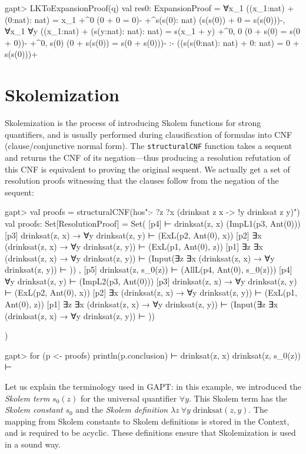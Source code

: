\documentclass[a4paper,11pt]{book}
\begin{document}
\begin{clilisting}
gapt> LKToExpansionProof(q)
val res0: ExpansionProof = ∀x_1 ((x_1:nat) + (0:nat): nat) = x_1
  +^{0} (0 + 0 = 0)-
  +^{s(s(0): nat)} (s(s(0)) + 0 = s(s(0)))-,
∀x_1 ∀y ((x_1:nat) + (s(y:nat): nat): nat) = s(x_1 + y)
  +^{0, 0} (0 + s(0) = s(0 + 0))-
  +^{0, s(0)} (0 + s(s(0)) = s(0 + s(0)))-
:-
((s(s(0:nat): nat) + 0: nat) = 0 + s(s(0)))+

\end{clilisting}

\section{Skolemization}\label{secskolem}

Skolemization is the process of introducing Skolem functions for strong
quantifiers, and is usually performed during clausification of formulas into
CNF (clause/conjunctive normal form).  The \texttt{structuralCNF} function
takes a sequent and returns the CNF of its negation---thus producing a
resolution refutation of this CNF is equivalent to proving the original
sequent.  We actually get a set of resolution proofs witnessing that the
clauses follow from the negation of the sequent:
\begin{clilisting}
gapt> val proofs = structuralCNF(hos":- ?z ?x (drinksat z x -> !y drinksat z y)")
val proofs: Set[ResolutionProof] = Set(
  [p4]  ⊢ drinksat(z, x)   (ImpL1(p3, Ant(0)))
[p3] drinksat(z, x) → ∀y drinksat(z, y) ⊢    (ExL(p2, Ant(0), x))
[p2] ∃x (drinksat(z, x) → ∀y drinksat(z, y)) ⊢    (ExL(p1, Ant(0), z))
[p1] ∃z ∃x (drinksat(z, x) → ∀y drinksat(z, y)) ⊢    (Input(∃z ∃x (drinksat(z, x) → ∀y drinksat(z, y)) ⊢ ))
,
  [p5] drinksat(z, s_0(z)) ⊢    (AllL(p4, Ant(0), s_0(z)))
[p4] ∀y drinksat(z, y) ⊢    (ImpL2(p3, Ant(0)))
[p3] drinksat(z, x) → ∀y drinksat(z, y) ⊢    (ExL(p2, Ant(0), x))
[p2] ∃x (drinksat(z, x) → ∀y drinksat(z, y)) ⊢    (ExL(p1, Ant(0), z))
[p1] ∃z ∃x (drinksat(z, x) → ∀y drinksat(z, y)) ⊢    (Input(∃z ∃x (drinksat(z, x) → ∀y drinksat(z, y)) ⊢ ))

)

gapt> for (p <- proofs) println(p.conclusion)
 ⊢ drinksat(z, x)
drinksat(z, s_0(z)) ⊢

\end{clilisting}

Let us explain the terminology used in GAPT: in this example, we introduced
the \emph{Skolem term} $s_0(z)$ for the universal quantifier $\forall y$.  This
Skolem term has the \emph{Skolem constant} $s_0$ and the \emph{Skolem
  definition} $\lambda z\: \forall y\; \mathrm{drinksat}(z,y)$.  The mapping from
Skolem constants to Skolem definitions is stored in the Context, and is
required to be acyclic.  These definitions ensure that Skolemization is used in
a sound way.
\end{document}
